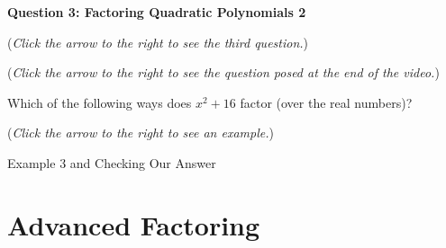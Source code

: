\documentclass{ximera}
\begin{document}
\textbf{Question 3: Factoring Quadratic Polynomials 2}
\begin{question}
\begin{flushright}
{\color{blue}(\emph{Click the arrow to the right to see the third question.})}
\end{flushright}
\begin{center}
\begin{expandable}
\begin{flushright}
{\color{blue}(\emph{Click the arrow to the right to see the  question
posed at the end of the video.})}
\end{flushright}
\begin{expandable}
Which of the following ways does $x^2+16$ factor (over the real numbers)?
\begin{multipleChoice}
\end{multipleChoice}
\begin{flushright}
{\color{blue}(\emph{Click the arrow to the right to see an example.})}
\end{flushright}
\begin{expandable}
\begin{center}
Example 3 and Checking Our Answer
\end{center}
\end{expandable}
\end{expandable}
\end{expandable}
\end{center}
\end{question}


\section{Advanced Factoring}
\end{document}
